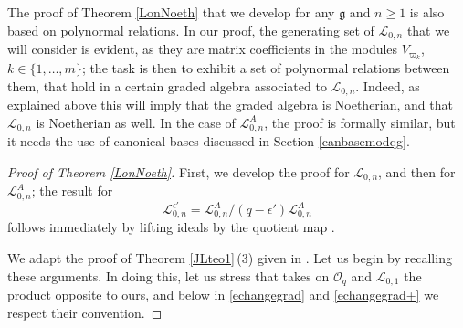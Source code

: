 \documentclass[11pt]{article}
\numberwithin{equation}{section}
\numberwithin{equation}{section}
\theoremstyle{definition}
\newcommand{\ep}{{\epsilon'}}
\newcommand{\Ll}{{\mathcal L}}
\newcommand{\ra}{\rightarrow}
\begin{document}
The proof of Theorem \ref{LonNoeth} that we develop for any $\mathfrak{g}$ and $n\geq 1$ is also based on polynormal relations. In our proof, the generating set of $\Ll_{0,n}$ that we will consider is evident, as they are matrix coefficients in the modules $V_{\varpi_k}$, $k\in\{1,\dots,m\}$; the task is then to exhibit a set of polynormal relations between them, that hold in a certain graded algebra associated to $\Ll_{0,n}$. Indeed, as explained above this will imply that the graded algebra is Noetherian, and that $\Ll_{0,n}$ is Noetherian as well. In the case of $\Ll_{0,n}^A$, the proof is formally similar, but it needs the use of canonical bases discussed in Section \ref{canbasemodqg}.

\begin{proof}[Proof of Theorem \ref{LonNoeth}] First, we develop the proof for $\Ll_{0,n}$, and then for $\Ll_{0,n}^A$; the result for%
\[\Ll_{0,n}^\ep\!= \Ll_{0,n}^A/(q-\ep)\Ll_{0,n}^A
\]
 follows immediately by lifting ideals by the quotient map \smash{$\Ll_{0,n}^A \!\ra \Ll_{0,n}^\ep$}.

We adapt the proof of Theorem \ref{JLteo1}\,(3) given in \cite[Theorem 3.137]{VY}. Let us begin by recalling these arguments. In doing this, let us stress that \cite{VY} takes on ${\mathcal O}_q$ and $\Ll_{0,1}$ the product opposite to ours, and below in \eqref{echangegrad} and \eqref{echangegrad+} we respect their convention.


\end{proof}
\end{document}
